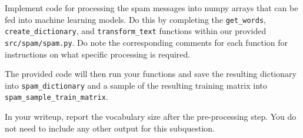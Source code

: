 \item {}
Implement code for processing the spam messages into numpy arrays that can be fed into machine learning models. Do this by completing the \texttt{get\_words}, \texttt{create\_dictionary}, and \texttt{transform\_text} functions within our provided \texttt{src/spam/spam.py}. Do note the corresponding comments for each function for instructions on what specific processing is required.

The provided code will then run your functions and save the resulting dictionary into \texttt{spam\_dictionary} and a sample of the resulting training matrix into\\
\texttt{spam\_sample\_train\_matrix}.

In your writeup, report the vocabulary size after the pre-processing step. You do not need to include any other output for this subquestion.



